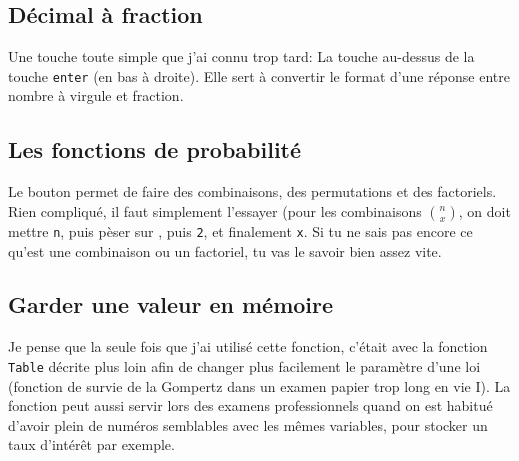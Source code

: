 \documentclass[french]{article}
\begin{document}
\subsection{Décimal à fraction}
Une touche toute simple que j'ai connu trop tard: La touche  %
au-dessus de la touche \texttt{enter} (en bas à droite). Elle sert à convertir le format d'une réponse entre nombre à virgule et fraction.

\subsection{Les fonctions de probabilité}
Le bouton  permet de faire des combinaisons, des permutations et des factoriels. Rien compliqué, il faut simplement l'essayer (pour les combinaisons ${n \choose x}$, on doit mettre \texttt{n}, puis pèser sur , puis \texttt{2}, et finalement \texttt{x}. Si tu ne sais pas encore ce qu'est une combinaison ou un factoriel, tu vas le savoir bien assez vite.

\subsection{Garder une valeur en mémoire}
Je pense que la seule fois que j'ai utilisé cette fonction, c'était avec la fonction \texttt{Table} décrite plus loin afin de changer plus facilement le paramètre d'une loi (fonction de survie de la Gompertz dans un examen papier trop long en vie I). La fonction peut aussi servir lors des examens professionnels quand on est habitué d'avoir plein de numéros semblables avec les mêmes variables, pour stocker un taux d'intérêt par exemple.
\end{document}
